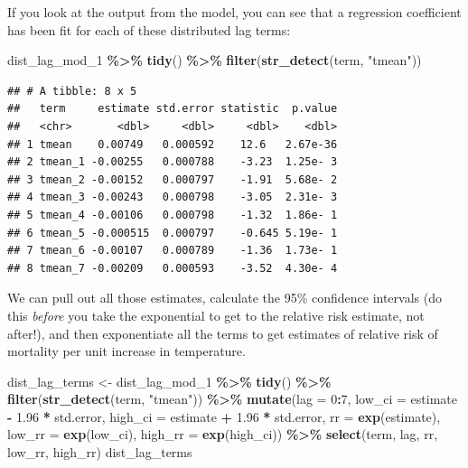 \documentclass[
]{book}
\newenvironment{Shaded}{\begin{snugshade}}{\end{snugshade}}
\newcommand{\AttributeTok}[1]{\textcolor[rgb]{0.13,0.29,0.53}{#1}}
\newcommand{\DecValTok}[1]{\textcolor[rgb]{0.00,0.00,0.81}{#1}}
\newcommand{\FloatTok}[1]{\textcolor[rgb]{0.00,0.00,0.81}{#1}}
\newcommand{\FunctionTok}[1]{\textcolor[rgb]{0.13,0.29,0.53}{\textbf{#1}}}
\newcommand{\NormalTok}[1]{#1}
\newcommand{\OtherTok}[1]{\textcolor[rgb]{0.56,0.35,0.01}{#1}}
\newcommand{\SpecialCharTok}[1]{\textcolor[rgb]{0.81,0.36,0.00}{\textbf{#1}}}
\newcommand{\StringTok}[1]{\textcolor[rgb]{0.31,0.60,0.02}{#1}}
\begin{document}
If you look at the output from the model, you can see that a regression coefficient has been
fit for each of these distributed lag terms:

\begin{Shaded}
\begin{Highlighting}[]
\NormalTok{dist\_lag\_mod\_1 }\SpecialCharTok{\%\textgreater{}\%} 
  \FunctionTok{tidy}\NormalTok{() }\SpecialCharTok{\%\textgreater{}\%} 
  \FunctionTok{filter}\NormalTok{(}\FunctionTok{str\_detect}\NormalTok{(term, }\StringTok{"tmean"}\NormalTok{))}
\end{Highlighting}
\end{Shaded}

\begin{verbatim}
## # A tibble: 8 x 5
##   term     estimate std.error statistic  p.value
##   <chr>       <dbl>     <dbl>     <dbl>    <dbl>
## 1 tmean    0.00749   0.000592    12.6   2.67e-36
## 2 tmean_1 -0.00255   0.000788    -3.23  1.25e- 3
## 3 tmean_2 -0.00152   0.000797    -1.91  5.68e- 2
## 4 tmean_3 -0.00243   0.000798    -3.05  2.31e- 3
## 5 tmean_4 -0.00106   0.000798    -1.32  1.86e- 1
## 6 tmean_5 -0.000515  0.000797    -0.645 5.19e- 1
## 7 tmean_6 -0.00107   0.000789    -1.36  1.73e- 1
## 8 tmean_7 -0.00209   0.000593    -3.52  4.30e- 4
\end{verbatim}

We can pull out all those estimates, calculate the 95\% confidence intervals (do this \emph{before}
you take the exponential to get to the relative risk estimate, not after!), and then
exponentiate all the terms to get estimates of relative risk of mortality per unit increase
in temperature.

\begin{Shaded}
\begin{Highlighting}[]
\NormalTok{dist\_lag\_terms }\OtherTok{\textless{}{-}}\NormalTok{ dist\_lag\_mod\_1 }\SpecialCharTok{\%\textgreater{}\%} 
  \FunctionTok{tidy}\NormalTok{() }\SpecialCharTok{\%\textgreater{}\%} 
  \FunctionTok{filter}\NormalTok{(}\FunctionTok{str\_detect}\NormalTok{(term, }\StringTok{"tmean"}\NormalTok{)) }\SpecialCharTok{\%\textgreater{}\%} 
  \FunctionTok{mutate}\NormalTok{(}\AttributeTok{lag =} \DecValTok{0}\SpecialCharTok{:}\DecValTok{7}\NormalTok{, }
         \AttributeTok{low\_ci =}\NormalTok{ estimate }\SpecialCharTok{{-}} \FloatTok{1.96} \SpecialCharTok{*}\NormalTok{ std.error, }
         \AttributeTok{high\_ci =}\NormalTok{ estimate }\SpecialCharTok{+} \FloatTok{1.96} \SpecialCharTok{*}\NormalTok{ std.error, }
         \AttributeTok{rr =} \FunctionTok{exp}\NormalTok{(estimate), }
         \AttributeTok{low\_rr =} \FunctionTok{exp}\NormalTok{(low\_ci), }
         \AttributeTok{high\_rr =} \FunctionTok{exp}\NormalTok{(high\_ci)) }\SpecialCharTok{\%\textgreater{}\%} 
  \FunctionTok{select}\NormalTok{(term, lag, rr, low\_rr, high\_rr)}
\NormalTok{dist\_lag\_terms}
\end{Highlighting}
\end{Shaded}
\end{document}
